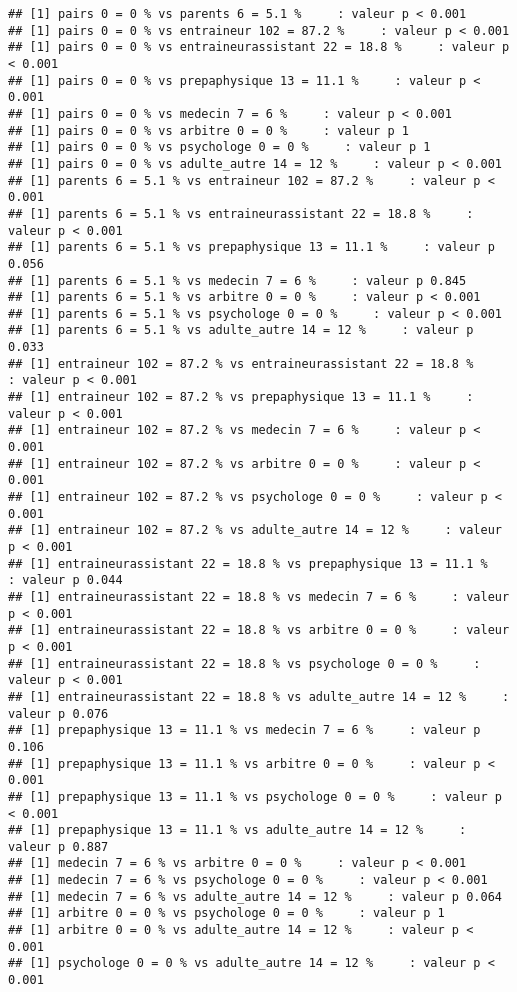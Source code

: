 \documentclass[
]{article}
\begin{document}
\begin{verbatim}
## [1] pairs 0 = 0 % vs parents 6 = 5.1 %     : valeur p < 0.001
## [1] pairs 0 = 0 % vs entraineur 102 = 87.2 %     : valeur p < 0.001
## [1] pairs 0 = 0 % vs entraineurassistant 22 = 18.8 %     : valeur p < 0.001
## [1] pairs 0 = 0 % vs prepaphysique 13 = 11.1 %     : valeur p < 0.001
## [1] pairs 0 = 0 % vs medecin 7 = 6 %     : valeur p < 0.001
## [1] pairs 0 = 0 % vs arbitre 0 = 0 %     : valeur p 1
## [1] pairs 0 = 0 % vs psychologe 0 = 0 %     : valeur p 1
## [1] pairs 0 = 0 % vs adulte_autre 14 = 12 %     : valeur p < 0.001
## [1] parents 6 = 5.1 % vs entraineur 102 = 87.2 %     : valeur p < 0.001
## [1] parents 6 = 5.1 % vs entraineurassistant 22 = 18.8 %     : valeur p < 0.001
## [1] parents 6 = 5.1 % vs prepaphysique 13 = 11.1 %     : valeur p 0.056
## [1] parents 6 = 5.1 % vs medecin 7 = 6 %     : valeur p 0.845
## [1] parents 6 = 5.1 % vs arbitre 0 = 0 %     : valeur p < 0.001
## [1] parents 6 = 5.1 % vs psychologe 0 = 0 %     : valeur p < 0.001
## [1] parents 6 = 5.1 % vs adulte_autre 14 = 12 %     : valeur p 0.033
## [1] entraineur 102 = 87.2 % vs entraineurassistant 22 = 18.8 %     : valeur p < 0.001
## [1] entraineur 102 = 87.2 % vs prepaphysique 13 = 11.1 %     : valeur p < 0.001
## [1] entraineur 102 = 87.2 % vs medecin 7 = 6 %     : valeur p < 0.001
## [1] entraineur 102 = 87.2 % vs arbitre 0 = 0 %     : valeur p < 0.001
## [1] entraineur 102 = 87.2 % vs psychologe 0 = 0 %     : valeur p < 0.001
## [1] entraineur 102 = 87.2 % vs adulte_autre 14 = 12 %     : valeur p < 0.001
## [1] entraineurassistant 22 = 18.8 % vs prepaphysique 13 = 11.1 %     : valeur p 0.044
## [1] entraineurassistant 22 = 18.8 % vs medecin 7 = 6 %     : valeur p < 0.001
## [1] entraineurassistant 22 = 18.8 % vs arbitre 0 = 0 %     : valeur p < 0.001
## [1] entraineurassistant 22 = 18.8 % vs psychologe 0 = 0 %     : valeur p < 0.001
## [1] entraineurassistant 22 = 18.8 % vs adulte_autre 14 = 12 %     : valeur p 0.076
## [1] prepaphysique 13 = 11.1 % vs medecin 7 = 6 %     : valeur p 0.106
## [1] prepaphysique 13 = 11.1 % vs arbitre 0 = 0 %     : valeur p < 0.001
## [1] prepaphysique 13 = 11.1 % vs psychologe 0 = 0 %     : valeur p < 0.001
## [1] prepaphysique 13 = 11.1 % vs adulte_autre 14 = 12 %     : valeur p 0.887
## [1] medecin 7 = 6 % vs arbitre 0 = 0 %     : valeur p < 0.001
## [1] medecin 7 = 6 % vs psychologe 0 = 0 %     : valeur p < 0.001
## [1] medecin 7 = 6 % vs adulte_autre 14 = 12 %     : valeur p 0.064
## [1] arbitre 0 = 0 % vs psychologe 0 = 0 %     : valeur p 1
## [1] arbitre 0 = 0 % vs adulte_autre 14 = 12 %     : valeur p < 0.001
## [1] psychologe 0 = 0 % vs adulte_autre 14 = 12 %     : valeur p < 0.001
\end{verbatim}
\end{document}
